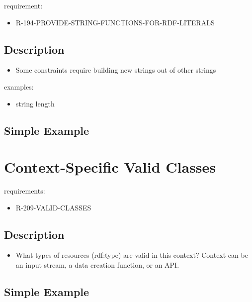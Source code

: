 \documentclass{llncs}
\begin{document}
requirement:

\begin{itemize}
	\item R-194-PROVIDE-STRING-FUNCTIONS-FOR-RDF-LITERALS
\end{itemize}

\subsection{Description}

\begin{itemize}
	\item Some constraints require building new strings out of other strings
\end{itemize}

examples:

\begin{itemize}
	\item string length
\end{itemize}

\subsection{Simple Example}





\section{Context-Specific Valid Classes}

requirements:

\begin{itemize}
	\item R-209-VALID-CLASSES
\end{itemize}

\subsection{Description}

\begin{itemize}
	\item What types of resources (rdf:type) are valid in this context? Context can be an input stream, a data creation function, or an API.
\end{itemize}

\subsection{Simple Example}
\end{document}
